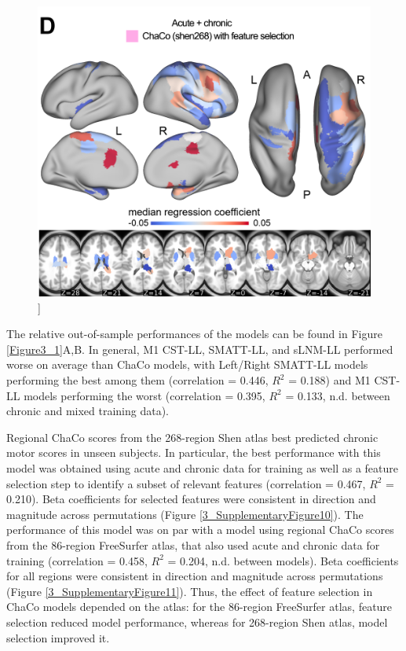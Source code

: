 \documentclass[phd,tocprelim]{cornell}
\renewcommand{\caption}[1]{\singlespacing\hangcaption{#1}\normalspacing}
\begin{document}
\null
\vfill
\clearpage
\null
\vfill
\begin{figure}[h!]
		\ContinuedFloat
		\captionsetup{labelformat=adja-page}
    \centering
    \includegraphics[width=1\textwidth]{chapter3/Figure1D.png}
    \caption[]{}
\end{figure}
\null
\vfill


The relative out-of-sample performances of the models can be found in Figure \ref{Figure3_1}A,B. In general, M1 CST-LL, SMATT-LL, and sLNM-LL performed worse on average than ChaCo models, with Left/Right SMATT-LL models performing the best among them (correlation = 0.446, $R^2$ = 0.188) and M1 CST-LL models performing the worst (correlation = 0.395, $R^2$ = 0.133, n.d. between chronic and mixed training data). 

Regional ChaCo scores from the 268-region Shen atlas best predicted chronic motor scores in unseen subjects. In particular, the best performance with this model was obtained using acute and chronic data for training as well as a feature selection step to identify a subset of relevant features (correlation = 0.467, $R^2$ = 0.210). Beta coefficients for selected features were consistent in direction and magnitude across permutations (Figure \ref{3_SupplementaryFigure10}). The performance of this model was on par with a model using regional ChaCo scores from the 86-region FreeSurfer atlas, that also used acute and chronic data for training (correlation = 0.458, $R^2$ = 0.204, n.d. between models). Beta coefficients for all regions were consistent in direction and magnitude across permutations (Figure  \ref{3_SupplementaryFigure11}). Thus, the effect of feature selection in ChaCo models depended on the atlas: for the 86-region FreeSurfer atlas, feature selection reduced model performance, whereas for 268-region Shen atlas, model selection improved it. 
\end{document}
